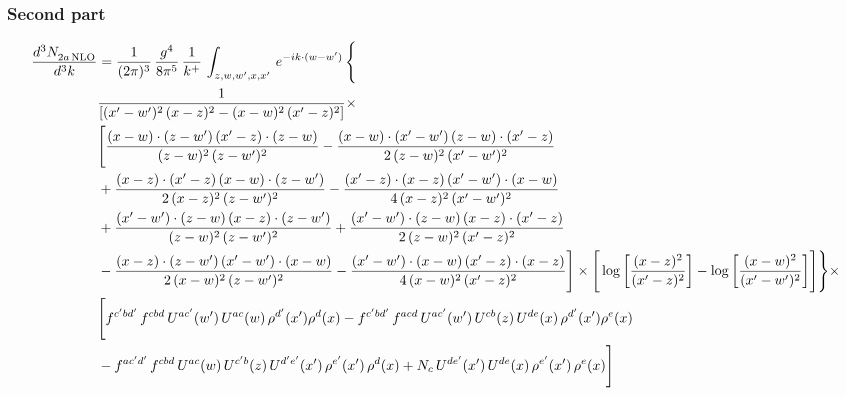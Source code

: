 \documentclass[9pt]{article}
\numberwithin{equation}{section}
\begin{document}
\subsubsection{Second part}
\begin{align}
    \frac{d^{3}N_{2a\,\rm NLO}^{\rm}}{d^{3}k}  & =  \frac{1}{(2\pi)^{3}}\, \frac{g^{4}}{8\pi^{5}}\,\frac{1}{k^{+}}\,\int_{z,w,w^{\prime},x,x'}\, e^{-ik\cdot (w-w')}\, \Bigg\{\notag \\
& \frac{1}{\left[(x'-w')^{2}\, (x-z)^{2}-(x-w)^{2}\, (x'-z)^{2}\right]}\times\,\notag \\ & \Bigg[\frac{(x-w)\cdot (z-w')\, (x'-z)\cdot (z-w)}{(z-w)^{2}\,(z-w')^{2}}-\frac{(x-w)\cdot (x'-w')\, (z-w)\cdot (x'-z)}{2\, (z-w)^{2}\, (x'-w')^{2}}\notag \\ & + \frac{(x-z)\cdot (x'-z)\, (x-w)\cdot (z-w')}{2\, (x-z)^{2}\, (z-w')^{2}}-\frac{(x'-z)\cdot (x-z)\, (x'-w')\cdot (x-w)}{4\, (x-z)^{2}\, (x'-w')^{2}}\notag \\ & + \frac{(x'-w')\cdot (z-w)\, (x-z)\cdot (z-w')}{(z-w)^{2}\,(z-w')^{2}}+\frac{(x'-w')\cdot (z-w)\, (x-z)\cdot (x'-z)}{2\, (z-w)^{2}\, (x'-z)^{2}}\notag \\ & - \frac{(x-z)\cdot (z-w')\, (x'-w')\cdot (x-w)}{2\, (x-w)^{2}\, (z-w')^{2}} -\frac{(x'-w')\cdot (x-w)\, (x'-z)\cdot (x-z)}{4\, (x-w)^{2}\, (x'-z)^{2}}\Bigg]\times  \Bigg[\log{\left[\frac{(x-z)^{2}}{ (x'-z)^{2}}\right]}-\log{\left[\frac{(x-w)^{2}}{(x'-w')^{2}}\right]}\Bigg]\Bigg\} \times\, \notag \\ & \Bigg[f^{c'bd'}\,f^{cbd}\, U^{ac'}(w')\,U^{ac}(w)\,\rho^{d'}(x')\rho^{d}(x)- f^{c'bd'}\,f^{acd}\,U^{ac'}(w')\,U^{cb}(z)\,U^{de}(x)\,\rho^{d'}(x')\rho^{e}(x) \notag \\ & -f^{ac'd'}\,f^{cbd}\,U^{ac}(w)\,U^{c'b}(z)\,U^{d'e'}(x')\,\rho^{e'}(x')\,\rho^{d}(x) +N_{c}\,U^{de'}(x')\,U^{de}(x)\,\rho^{e'}(x')\,\rho^{e}(x)\Bigg]
\end{align}
\end{document}
